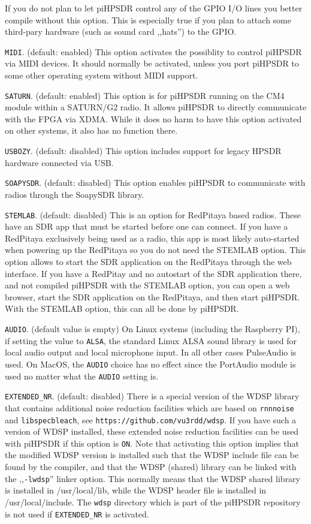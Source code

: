 \documentclass[12pt]{book}
\def\rett#1{\texttt{\color{red}#1}}
\begin{document}
If you do not plan to let piHPSDR control any of the GPIO I/O lines you better compile without this option.
This is especially true if you plan to attach some third-pary hardware (such as sound card ,,hats'')
to the GPIO.

\rett{MIDI}. (default: enabled)
This option activates the possiblity to control piHPSDR via MIDI devices. It should normally be
activated, unless you port piHPSDR to some other operating system without MIDI support.

\rett{SATURN}. (default: enabled)
This option is for piHPSDR running on the CM4 module within a SATURN/G2 radio. It allows
piHPSDR to directly communicate with the FPGA via XDMA. While it does no harm to have this option activated
on other systems, it also has no function there.

\rett{USBOZY}. (default: disabled)
This option includes support for legacy HPSDR hardware connected via USB.

\rett{SOAPYSDR}. (default: disabled)
This option enables piHPSDR to communicate with radios through the SoapySDR library.

\rett{STEMLAB}. (default: disabled)
This is an option for RedPitaya based radios. These have an SDR app that must be
started before one can connect. If you have a RedPitaya exclusively being used as a radio, this
app is most likely auto-started when powering up the RedPitaya so you do not need the STEMLAB
option. This option allows to start the SDR application on the RedPitaya through the web interface.
If you have a RedPitay and no autostart of the SDR application there, and not compiled piHPSDR
with the STEMLAB option, you can open a web browser, start the SDR application on the RedPitaya,
and then start piHPSDR. With the STEMLAB option, this can all be done by piHPSDR.

\rett{AUDIO}. (default value is empty)
On Linux systems (including the Raspberry PI), if setting the value to \texttt{ALSA},
the standard Linux ALSA sound library is used for local audio
output and local microphone input. In all other cases
PulseAudio is used. On MacOS, the \texttt{AUDIO} choice has no effect since the PortAudio
module is used no matter what the \texttt{AUDIO} setting is.

\rett{EXTENDED\_NR}. (default: disabled)
There is a special version of the WDSP library that contains additional noise
reduction facilities which are based on  \texttt{rnnnoise} and \texttt{libspecbleach}, see
 \texttt{https://github.com/vu3rdd/wdsp}. If you have such a version of WDSP installed, these
 extended noise reduction facilities can be used with piHPSDR if this option is \texttt{ON}.
 Note that activating this option implies that the modified WDSP version is installed such
 that the WDSP include file can be found by the compiler, and that the WDSP (shared)
 library can be linked with the ,,\texttt{-lwdsp}'' linker option. This normally means
 that the WDSP shared library is installed in /usr/local/lib, while the WDSP header file
 is installed in /usr/local/include. The \texttt{wdsp} directory which is part of
 the piHPSDR repository is not used if \texttt{EXTENDED\_NR} is activated.
\end{document}
